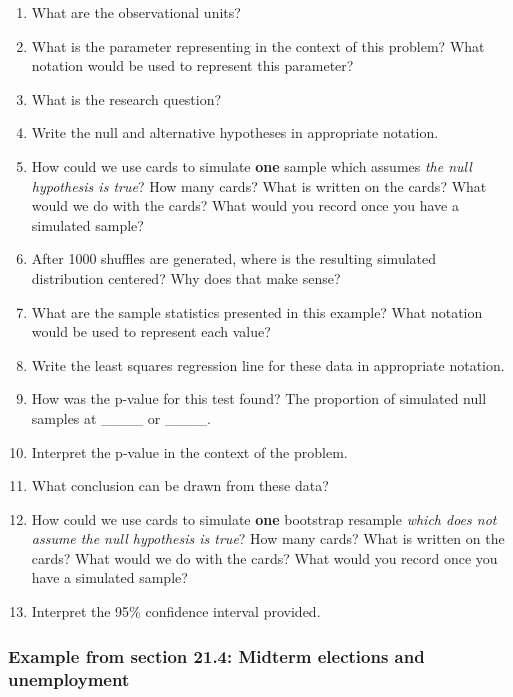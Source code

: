 \documentclass[
]{report}
\newcommand{\rgs}{\vspace{12pt}} %
\begin{document}
\begin{enumerate}
\def\labelenumi{\arabic{enumi}.}
\item
  What are the observational units?
  \rgs
\item
  What is the parameter representing in the context of this problem? What notation would be used to represent this parameter?
  \rgs
  \rgs
\item
  What is the research question?
  \rgs
\item
  Write the null and alternative hypotheses in appropriate notation.
  \rgs
\item
  How could we use cards to simulate \textbf{one} sample which assumes \emph{the null hypothesis is true}? How many cards? What is written on the cards? What would we do with the cards? What would you record once you have a simulated sample?
  \rgs
  \rgs
  \rgs
\item
  After 1000 shuffles are generated, where is the resulting simulated distribution centered? Why does that make sense?
  \rgs
  \rgs
\item
  What are the sample statistics presented in this example? What notation would be used to represent each value?
  \rgs
\item
  Write the least squares regression line for these data in appropriate notation.
  \rgs
\item
  How was the p-value for this test found? The proportion of simulated null samples at \_\_\_\_ or \_\_\_\_.
  \rgs
\item
  Interpret the p-value in the context of the problem.
  \rgs
  \rgs
\item
  What conclusion can be drawn from these data?\\
  \rgs
\item
  How could we use cards to simulate \textbf{one} bootstrap resample \emph{which does not assume the null hypothesis is true}? How many cards? What is written on the cards? What would we do with the cards? What would you record once you have a simulated sample?
  \rgs
  \rgs
  \rgs
\item
  Interpret the 95\% confidence interval provided.
  \rgs
  \rgs
\end{enumerate}

\hypertarget{example-from-section-21.4-midterm-elections-and-unemployment}{%
\subsubsection*{Example from section 21.4: Midterm elections and unemployment}\label{example-from-section-21.4-midterm-elections-and-unemployment}}
\end{document}
